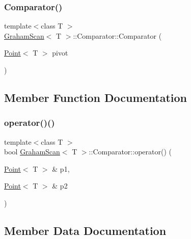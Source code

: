 \subsubsection{\texorpdfstring{Comparator()}{Comparator()}}
{\footnotesize\ttfamily template$<$class T $>$ \\
\mbox{\hyperlink{classGrahamScan}{Graham\+Scan}}$<$ T $>$\+::Comparator\+::\+Comparator (\begin{DoxyParamCaption}\item[{\mbox{\hyperlink{classPoint}{Point}}$<$ T $>$}]{pivot }\end{DoxyParamCaption})\hspace{0.3cm}{\ttfamily [inline]}}



\subsection{Member Function Documentation}
\mbox{\label{classGrahamScan_1_1Comparator_a3495ee5d0f1c01f201373b77f71514cb}} 
\subsubsection{\texorpdfstring{operator()()}{operator()()}}
{\footnotesize\ttfamily template$<$class T $>$ \\
bool \mbox{\hyperlink{classGrahamScan}{Graham\+Scan}}$<$ T $>$\+::Comparator\+::operator() (\begin{DoxyParamCaption}\item[{\mbox{\hyperlink{classPoint}{Point}}$<$ T $>$ \&}]{p1,  }\item[{\mbox{\hyperlink{classPoint}{Point}}$<$ T $>$ \&}]{p2 }\end{DoxyParamCaption})\hspace{0.3cm}{\ttfamily [inline]}}



\subsection{Member Data Documentation}
\mbox{\label{classGrahamScan_1_1Comparator_ad20dd6c63895a0924c743879f721b4a8}} 
